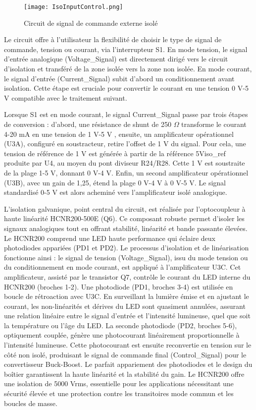 \begin{figure}[H]
\centering
\texttt{[image: IsoInputControl.png]}
\caption{Circuit de signal de commande externe isolé}
\label{fig:iso_input_control}
\end{figure}

Le circuit offre à l'utilisateur la flexibilité de choisir le type de signal de commande, tension ou courant, via l'interrupteur S1. En mode tension, le signal d'entrée analogique (Voltage\_Signal) est directement dirigé vers le circuit d'isolation et transféré de la zone isolée vers la zone non isolée. En mode courant, le signal d'entrée (Current\_Signal) subit d'abord un conditionnement avant isolation. Cette étape est cruciale pour convertir le courant en une tension 0 V-5 V compatible avec le traitement suivant.

Lorsque S1 est en mode courant, le signal Current\_Signal passe par trois étapes de conversion : d'abord, une résistance de shunt de 250 $\Omega$ transforme le courant 4-20 mA en une tension de 1 V-5 V , ensuite, un amplificateur opérationnel (U3A), configuré en soustracteur, retire l'offset de 1 V du signal. Pour cela, une tension de référence de 1 V est générée à partir de la référence 5Viso\_ref produite par U4, au moyen du pont diviseur R24/R28. Cette 1 V est soustraite de la plage 1-5 V, donnant 0 V-4 V. Enfin, un second amplificateur opérationnel (U3B), avec un gain de 1,25, étend la plage 0 V-4 V à 0 V-5 V. Le signal standardisé 0-5 V est alors acheminé vers l'amplificateur isolé analogique.

L'isolation galvanique, point central du circuit, est réalisée par l'optocoupleur à haute linéarité HCNR200-500E (Q6). Ce composant robuste permet d'isoler les signaux analogiques tout en offrant stabilité, linéarité et bande passante élevées. Le HCNR200 comprend une LED haute performance qui éclaire deux photodiodes appariées (PD1 et PD2). Le processus d'isolation et de linéarisation fonctionne ainsi : le signal de tension (Voltage\_Signal), issu du mode tension ou du conditionnement en mode courant, est appliqué à l'amplificateur U3C. Cet amplificateur, assisté par le transistor Q7, contrôle le courant du LED interne du HCNR200 (broches 1-2). Une photodiode (PD1, broches 3-4) est utilisée en boucle de rétroaction avec U3C. En surveillant la lumière émise et en ajustant le courant, les non-linéarités et dérives du LED sont quasiment annulées, assurant une relation linéaire entre le signal d'entrée et l'intensité lumineuse, quel que soit la température ou l'âge du LED. La seconde photodiode (PD2, broches 5-6), optiquement couplée, génère une photocourant linéairement proportionnelle à l'intensité lumineuse. Cette photocourant est ensuite reconvertie en tension sur le côté non isolé, produisant le signal de commande final (Control\_Signal) pour le convertisseur Buck-Boost. Le parfait appariement des photodiodes et le design du boîtier garantissent la haute linéarité et la stabilité du gain. Le HCNR200 offre une isolation de 5000 Vrms, essentielle pour les applications nécessitant une sécurité élevée et une protection contre les transitoires mode commun et les boucles de masse.






